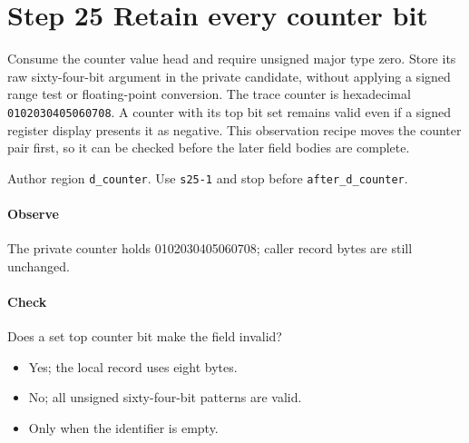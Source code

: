 \section{Step 25 Retain every counter bit}\label{cbor-s25}
Consume the counter value head and require unsigned major type zero. Store its raw sixty-four-bit argument in the private candidate, without applying a signed range test or floating-point conversion. The trace counter is hexadecimal \texttt{0102030405060708}. A counter with its top bit set remains valid even if a signed register display presents it as negative. This observation recipe moves the counter pair first, so it can be checked before the later field bodies are complete.

Author region \texttt{d\_counter}. Use \texttt{s25-1} and stop before \texttt{after\_d\_counter}.

\paragraph{Observe} The private counter holds 0102030405060708; caller record bytes are still unchanged.

\paragraph{Check} Does a set top counter bit make the field invalid?
\begin{itemize}
\item[A.] Yes; the local record uses eight bytes.
\item[B.] No; all unsigned sixty-four-bit patterns are valid.
\item[C.] Only when the identifier is empty.
\end{itemize}
